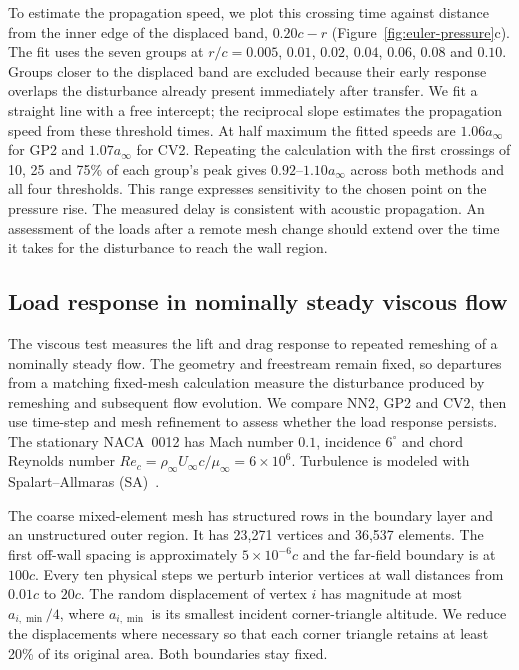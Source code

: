 \documentclass[a4paper,fleqn]{cas-sc}
\begin{document}
To estimate the propagation speed, we plot this crossing time against distance from the inner edge of the displaced band, $0.20c-r$ (Figure~\ref{fig:euler-pressure}c). The fit uses the seven groups at $r/c=0.005$, $0.01$, $0.02$, $0.04$, $0.06$, $0.08$ and $0.10$. Groups closer to the displaced band are excluded because their early response overlaps the disturbance already present immediately after transfer. We fit a straight line with a free intercept; the reciprocal slope estimates the propagation speed from these threshold times. At half maximum the fitted speeds are $1.06a_\infty$ for GP2 and $1.07a_\infty$ for CV2. Repeating the calculation with the first crossings of 10, 25 and 75\% of each group's peak gives $0.92$--$1.10a_\infty$ across both methods and all four thresholds. This range expresses sensitivity to the chosen point on the pressure rise. The measured delay is consistent with acoustic propagation. An assessment of the loads after a remote mesh change should extend over the time it takes for the disturbance to reach the wall region.

\subsection{Load response in nominally steady viscous flow}
\label{sec:rans-methodology}
\label{sec:results-rans-new}

The viscous test measures the lift and drag response to repeated remeshing of a nominally steady flow. The geometry and freestream remain fixed, so departures from a matching fixed-mesh calculation measure the disturbance produced by remeshing and subsequent flow evolution. We compare NN2, GP2 and CV2, then use time-step and mesh refinement to assess whether the load response persists. The stationary NACA~0012 has Mach number $0.1$, incidence $6^\circ$ and chord Reynolds number $Re_c=\rho_\infty U_\infty c/\mu_\infty=6\times10^6$. Turbulence is modeled with Spalart--Allmaras (SA)~\cite{SpalartAllmaras1994}.

The coarse mixed-element mesh has structured rows in the boundary layer and an unstructured outer region. It has 23,271 vertices and 36,537 elements. The first off-wall spacing is approximately $5\times10^{-6}c$ and the far-field boundary is at $100c$. Every ten physical steps we perturb interior vertices at wall distances from $0.01c$ to $20c$. The random displacement of vertex $i$ has magnitude at most $a_{i,\min}/4$, where $a_{i,\min}$ is its smallest incident corner-triangle altitude. We reduce the displacements where necessary so that each corner triangle retains at least 20\% of its original area. Both boundaries stay fixed.
\end{document}
